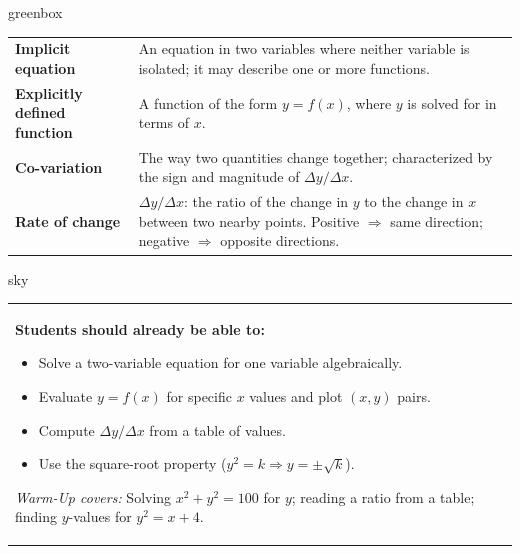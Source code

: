\documentclass[10pt]{article}
\begin{document}
\begin{skillbox}{greenbox}
\renewcommand{\arraystretch}{1.5}
\begin{tabularx}{\linewidth}{@{} l X @{}}
\textbf{Implicit equation} & An equation in two variables where neither variable is isolated;
  it may describe one or more functions. \\
\textbf{Explicitly defined function} & A function of the form $y = f(x)$, where $y$ is
  solved for in terms of $x$. \\
\textbf{Co-variation} & The way two quantities change together; characterized by the sign
  and magnitude of $\Delta y/\Delta x$. \\
\textbf{Rate of change} & $\Delta y/\Delta x$: the ratio of the change in $y$ to the change
  in $x$ between two nearby points. Positive $\Rightarrow$ same direction;
  negative $\Rightarrow$ opposite directions. \\
\end{tabularx}
\end{skillbox}

\begin{skillbox}{sky}
    \begin{tabularx}{\linewidth}{@{}X c@{}}
        \begin{minipage}[t]{0.55\linewidth}\vspace{0pt}
            \textbf{Students should already be able to:}
            \begin{itemize}[leftmargin=1.2em, itemsep=2pt]
                \item Solve a two-variable equation for one variable algebraically.
                \item Evaluate $y = f(x)$ for specific $x$ values and plot $(x, y)$ pairs.
                \item Compute $\Delta y/\Delta x$ from a table of values.
                \item Use the square-root property ($y^2 = k \Rightarrow y = \pm\sqrt{k}$).
            \end{itemize}
            \vspace{4pt}\textit{Warm-Up covers:} Solving $x^2+y^2=100$ for $y$;
            reading a ratio from a table; finding $y$-values for $y^2 = x+4$.
        \end{minipage}
        &
        \begin{minipage}[t]{0.38\linewidth}\vspace{0pt}\centering
        \end{minipage}
    \end{tabularx}
\end{skillbox}
\end{document}
